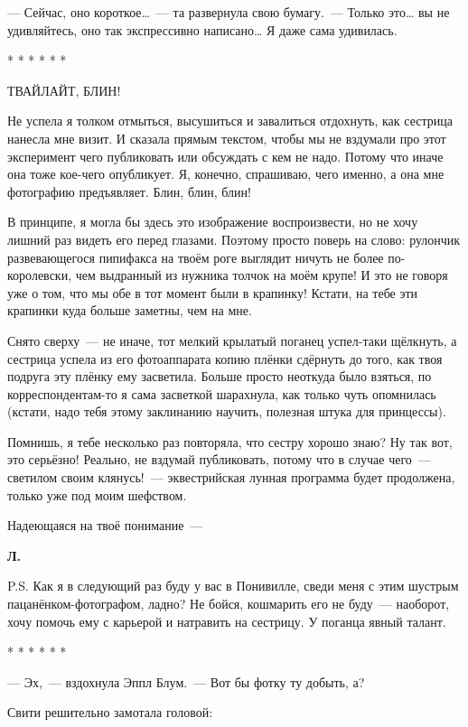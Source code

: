 \documentclass[fontsize=11pt,a5paper,titlepage=firstcover]{scrbook}
\begin{document}
--- Сейчас, оно короткое{\ldots}~--- та развернула свою бумагу.~--- Только это{\ldots} вы не удивляйтесь, оно так экспрессивно написано{\ldots} Я даже сама удивилась.
\begin{center}
	* * * * * *
\end{center}

ТВАЙЛАЙТ, БЛИН!

Не успела я толком отмыться, высушиться и завалиться отдохнуть, как сестрица нанесла мне визит. И сказала прямым текстом, чтобы мы не вздумали про этот эксперимент чего публиковать или обсуждать с кем не надо. Потому что иначе она тоже кое-чего опубликует. Я, конечно, спрашиваю, чего именно, а она мне фотографию предъявляет. Блин, блин, блин!

В принципе, я могла бы здесь это изображение воспроизвести, но не хочу лишний раз видеть его перед глазами. Поэтому просто поверь на слово: рулончик развевающегося пипифакса на твоём роге выглядит ничуть не более по-королевски, чем выдранный из нужника толчок на моём крупе! И это не говоря уже о том, что мы обе в тот момент были в крапинку! Кстати, на тебе эти крапинки куда больше заметны, чем на мне.

Снято сверху~--- не иначе, тот мелкий крылатый поганец успел-таки щёлкнуть, а сестрица успела из его фотоаппарата копию плёнки сдёрнуть до того, как твоя подруга эту плёнку ему засветила. Больше просто неоткуда было взяться, по корреспондентам-то я сама засветкой шарахнула, как только чуть опомнилась (кстати, надо тебя этому заклинанию научить, полезная штука для принцессы).

Помнишь, я тебе несколько раз повторяла, что сестру хорошо знаю? Ну так вот, это серьёзно! Реально, не вздумай публиковать, потому что в случае чего~--- светилом своим клянусь!~--- эквестрийская лунная программа будет продолжена, только уже под моим шефством.

Надеющаяся на твоё понимание~---
\begin{flushright}\textbf{Л.}\end{flushright}
P.S. Как я в следующий раз буду у вас в Понивилле, сведи меня с этим шустрым пацанёнком-фотографом, ладно? Не бойся, кошмарить его не буду~--- наоборот, хочу помочь ему с карьерой и натравить на сестрицу. У поганца явный талант.
\begin{center}
	* * * * * *
\end{center}

--- Эх,~--- вздохнула Эппл Блум.~--- Вот бы фотку ту добыть, а?

Свити решительно замотала головой:
\end{document}

